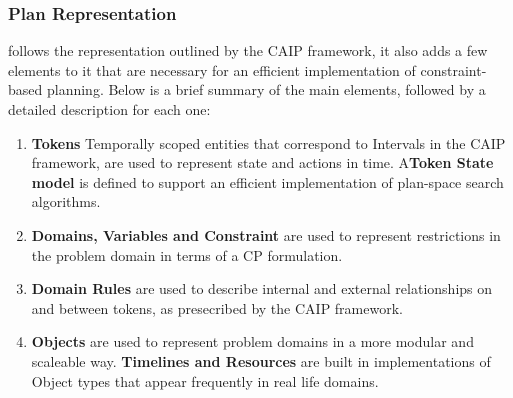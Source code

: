 \subsubsection{\eu Plan Representation}
\label{sec:europa:pr}

\eu follows the representation outlined by the CAIP framework, it also adds a few elements to it that are necessary for an efficient implementation of constraint-based planning. Below is a brief summary of the main elements, followed by a detailed description for each one:


\begin{enumerate}
\item \textbf{Tokens} Temporally scoped entities that correspond to Intervals in the CAIP framework, are used to represent  state and actions in time. A\textbf{Token State model} is defined to support an efficient implementation of plan-space search algorithms.

\item \textbf{Domains, Variables and Constraint} are used to represent restrictions in the problem domain in terms of a CP formulation.

\item \textbf{Domain Rules} are used to describe internal and external relationships on and between tokens, as presecribed by the CAIP framework.
  
\item \textbf{Objects} are used to represent problem domains in a more modular and scaleable way. \textbf{Timelines and Resources} are built in implementations of Object types that appear frequently in real life domains.

\end{enumerate}


